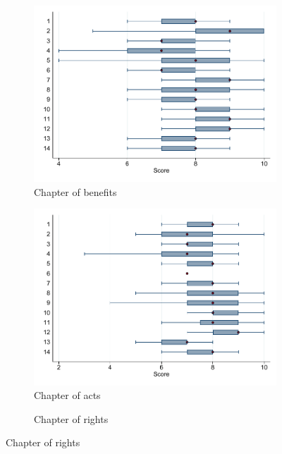 \documentclass[oneside,11pt]{article}
\begin{document}
\begin{figure}[H]
\begin{center}
\begin{subfigure}{0.49\textwidth}
        \caption{Chapter of benefits}
        \centering
        \includegraphics[width=\textwidth]{Figuras/boxplot_calif_prestaciones.pdf}
    \end{subfigure}
    \begin{subfigure}{0.49\textwidth}
        \caption{Chapter of acts}
        \centering
        \includegraphics[width=\textwidth]{Figuras/boxplot_calif_hechos.pdf}
    \end{subfigure}    
 \begin{subfigure}{0.49\textwidth}
        \caption{Chapter of rights}
        \centering

\end{subfigure}
\end{center}
\end{figure}
\end{document}
